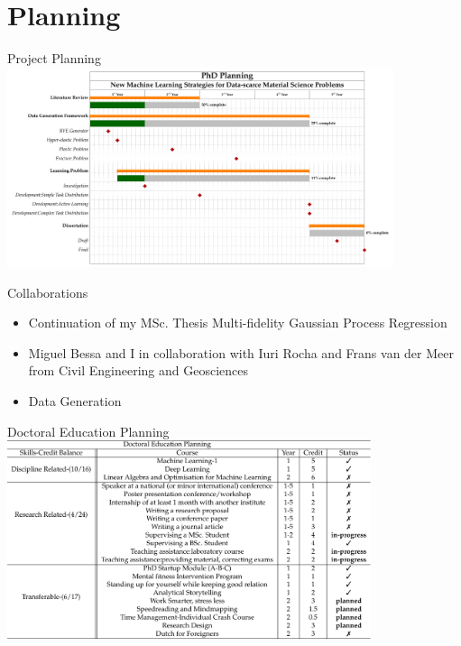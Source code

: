 \section{Planning}

\begin{frame}{Project Planning}
  \includegraphics[width=0.85\textwidth]{Figures/planning/project_plan}
\end{frame}

\begin{frame}{Collaborations}
  \begin{itemize}
    \item Continuation of my MSc. Thesis Multi-fidelity Gaussian Process Regression 
    \item Miguel Bessa and I in collaboration with Iuri Rocha and Frans van der Meer from Civil Engineering and Geosciences  
    \item Data Generation
  \end{itemize}
\end{frame}

\begin{frame}{Doctoral Education Planning}
\centering
  \includegraphics[width=0.8\textwidth]{Figures/planning/doctoral_education_plan}
\end{frame}


